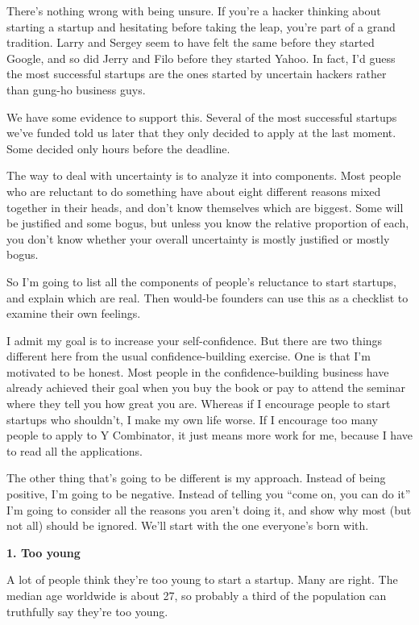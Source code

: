 \documentclass[12pt]{book}
\begin{document}
There's nothing wrong with being unsure. If you're a hacker thinking
about starting a startup and hesitating before taking the leap, you're
part of a grand tradition. Larry and Sergey seem to have felt the same
before they started Google, and so did Jerry and Filo before they
started Yahoo. In fact, I'd guess the most successful startups are the
ones started by uncertain hackers rather than gung-ho business guys.

We have some evidence to support this. Several of the most successful
startups we've funded told us later that they only decided to apply at
the last moment. Some decided only hours before the deadline.

The way to deal with uncertainty is to analyze it into components. Most
people who are reluctant to do something have about eight different
reasons mixed together in their heads, and don't know themselves which
are biggest. Some will be justified and some bogus, but unless you know
the relative proportion of each, you don't know whether your overall
uncertainty is mostly justified or mostly bogus.

So I'm going to list all the components of people's reluctance to start
startups, and explain which are real. Then would-be founders can use
this as a checklist to examine their own feelings.

I admit my goal is to increase your self-confidence. But there are two
things different here from the usual confidence-building exercise. One
is that I'm motivated to be honest. Most people in the
confidence-building business have already achieved their goal when you
buy the book or pay to attend the seminar where they tell you how great
you are. Whereas if I encourage people to start startups who shouldn't,
I make my own life worse. If I encourage too many people to apply to Y
Combinator, it just means more work for me, because I have to read all
the applications.

The other thing that's going to be different is my approach. Instead of
being positive, I'm going to be negative. Instead of telling you ``come
on, you can do it'' I'm going to consider all the reasons you aren't
doing it, and show why most (but not all) should be ignored. We'll start
with the one everyone's born with.

\textbf{1. Too young}

A lot of people think they're too young to start a startup. Many are
right. The median age worldwide is about 27, so probably a third of the
population can truthfully say they're too young.
\end{document}

